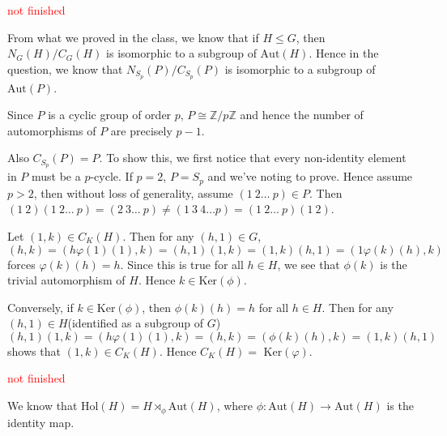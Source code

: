 \documentclass[12pt]{exam}
\theoremstyle{plain} %
\theoremstyle{definition} %
\theoremstyle{remark} %
\begin{document}
\begin{questions}
  \question
  \textcolor{red}{not finished}

  \begin{solution}
    From what we proved in the class, we know that if $H \leqslant
    G$, then $N_G(H)/C_G(H)$ is isomorphic to a subgroup of
    $\textrm{Aut}(H)$. Hence in the question, we know that
    $N_{S_p}(P)/C_{S_p}(P)$ is isomorphic to a subgroup of $\textrm{Aut}(P)$.

    Since $P$ is a cyclic group of order $p$, $P \cong
    \mathbb{Z}/p\mathbb{Z}$ and hence the number of automorphisms of
    $P$ are precisely $p-1$.

    Also $C_{S_p}(P) = P$. To show this, we first notice that every
    non-identity element in $P$ must be a $p$-cycle. If $p = 2$,
    $P = S_p$ and we've noting to prove. Hence assume $p >
    2$, then without loss of generality, assume $(1 \ 2 \ldots \ p)
    \in P$. Then $(1\ 2)(1 \ 2 \ldots \ p) = (2 \ 3 \ldots\ p) \neq
    (1 \ 3 \ 4 \ldots p) = (1 \ 2 \ldots \ p)(1\ 2)$.
  \end{solution}

  \question
  \begin{solution}
    Let $(1, k) \in C_K(H)$. Then for any $(h, 1) \in G$, $$(h, k) =
    (h\varphi(1)(1), k) = (h, 1)(1,k)  = (1, k)(h, 1) =  (1\varphi(k)(h), k)$$
    forces $\varphi(k)(h) = h$. Since this is true for all $h \in H$,
    we see that $\phi(k)$ is the trivial automorphism of $H$. Hence
    $k \in \textrm{Ker}(\phi)$.

    Conversely, if $k \in \textrm{Ker}(\phi)$, then $\phi(k)(h) = h$
    for all $h \in H$. Then for any $(h, 1) \in H$(identified as a
    subgroup of $G$) \[
      (h, 1)(1, k) = (h \varphi(1)(1), k) = (h, k) = (\phi(k)(h), k)
      = (1, k)(h, 1)
    \]
    shows that $(1, k) \in C_K(H)$. Hence $C_K(H) = \textrm{ Ker}(\varphi)$.
  \end{solution}

  \question
  \textcolor{red}{not finished}

  \begin{solution}
    We know that $\textrm{Hol}(H) = H \rtimes_\phi \textrm{Aut}(H)$,
    where $\phi: \textrm{Aut}(H) \to \textrm{Aut}(H)$ is the identity map.
\end{solution}
\end{questions}
\end{document}
